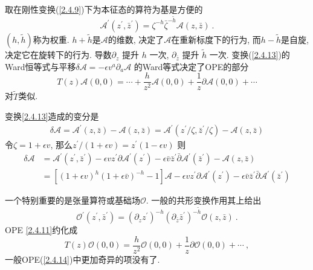 取在刚性变换(\ref{2.4.9})下为本征态的算符为基是方便的
\begin{equation}\label{2.4.13}
\mathscr{A}^{\prime}(z^{\prime}, \bar{z}^{\prime})=\zeta^{-h} \bar{\zeta}^{-\tilde{h}} \mathscr{A}(z, \bar{z}) \:.
\end{equation}
$(h, \tilde{h})$称为权重. $h+ \tilde{h}$是$\mathscr{A}$的维数, 决定了$\mathscr{A}$在重新标度下的行为, 而$h- \tilde{h}$是自旋, 决定它在旋转下的行为. 导数$\partial_z$ 提升 $h$ 一次,   $\partial_{\bar{z}}$ 提升 $\tilde{h}$ 一次. 变换(\ref{2.4.13})的Ward恒等式与平移$\delta \mathscr{A}=-\epsilon v^{a} \partial_{a} \mathscr{A}$ 的Ward等式决定了OPE的部分
\begin{equation}\label{2.4.14}
T(z) \mathscr{A}(0,0)=\cdots+\frac{h}{z^{2}} \mathscr{A}(0,0)+\frac{1}{z} \partial \mathscr{A}(0,0)+\cdots
\end{equation}
对$\tilde{T}$类似.
\begin{tcolorbox}
	\begin{remark}
		变换\eqref{2.4.13}造成的变分是
		\begin{align*}
		\delta \mathscr{A} =\mathscr{A}^{\prime}(z, \bar{z})-\mathscr{A}(z, \bar{z}) 
		=\mathscr{A}^{\prime}(z^{\prime} / \zeta, \bar{z}^{\prime} / \zeta)-\mathscr{A} ( z, \bar{z})
		\end{align*}
		令$\zeta=1+\epsilon v$, 那么$z^{\prime} / (1+\epsilon v)=z^{\prime}(1-\epsilon v)$
		则
		$$
		\begin{aligned}
		\delta \mathscr{A} &=\mathscr{A}^{\prime}(z^{\prime}, \bar{z}^{\prime})-\epsilon v z^{\prime} \partial \mathscr{A}^{\prime}\left(z^{\prime}\right)-\epsilon \bar{v}{\bar{z}^{\prime}} \bar{\partial} \mathscr{A}^{\prime}(\bar{z}^{\prime})-\mathscr{A}(z, \bar{z}) \\
		&=[(1+\epsilon v)^{h}(1+\epsilon\bar{v})^{-h} -1] \mathscr{A}  
		-\epsilon v z^{\prime} \partial \mathscr{A}^{\prime}(z^{\prime})-\epsilon \bar{v} \bar{z}^{\prime} \bar{\partial} \mathscr{A}^{\prime}(\bar{z}^{\prime})
		\end{aligned}
		$$
		\end{remark}
\end{tcolorbox}

一个特别重要的是张量算符或基础场$\mathcal{O}$.  一般的共形变换作用其上给出
\begin{equation}
\mathcal{O}^{\prime}(z^{\prime}, \bar{z}^{\prime})= (\partial_{z} z^{\prime})^{-h}(\partial_{\bar{z}} \bar{z}^{\prime})^{-\tilde{h}} \mathcal{O}(z, \bar{z}) \:.
\end{equation}
OPE \eqref{2.4.11}约化成
\begin{equation}\label{2.4.16}
T(z) \mathcal{O}(0,0)=\frac{h}{z^{2}} \mathcal{O}(0,0)+\frac{1}{z} \partial \mathcal{O}(0,0)+\cdots \:,
\end{equation}
一般OPE(\ref{2.4.14})中更加奇异的项没有了.

